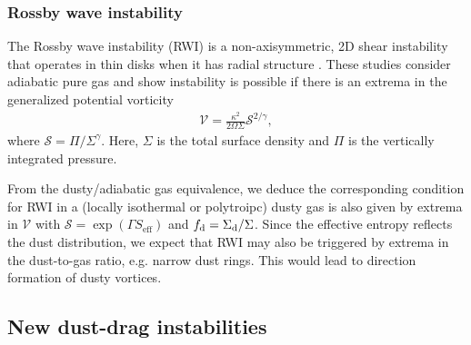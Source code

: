 
\subsubsection{Rossby wave instability}
The Rossby wave instability (RWI) is a non-axisymmetric, 2D shear
instability that operates in thin disks when it has radial structure
\citep{lovelace99,li00}. These studies consider adiabatic pure gas and 
show instability is possible if there is an extrema in the generalized
potential vorticity 
\begin{align}
 \mathcal{V} = \frac{\kappa^2}{2\Omega\Sigma}\mathcal{S}^{2/\gamma},  
\end{align} 
where $\mathcal{S} = \Pi/\Sigma^\gamma$. Here, $\Sigma$ is the total
surface density and $\Pi$ is the vertically integrated pressure. 

From the dusty/adiabatic gas equivalence, we deduce the corresponding
condition for RWI in a (locally isothermal or polytroipc) dusty gas is
also given by extrema in $\mathcal{V}$ with $\mathcal{S} = \exp{\left(\Gamma
S_\mathrm{eff}\right)}$ and $f_\mathrm{d} = \Sigma_\mathrm{d}/\Sigma$. Since
the effective entropy reflects the dust distribution, we expect that
RWI may also be triggered by extrema in the dust-to-gas ratio, e.g. 
narrow dust rings. This would lead to direction formation of dusty
vortices. 



\subsection{New dust-drag
  instabilities}\label{dust_as_thermo} 


